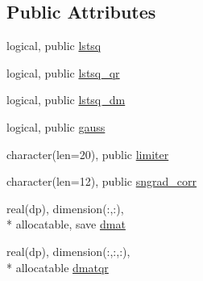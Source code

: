 \subsection*{Public Attributes}
\begin{DoxyCompactItemize}
\item 
logical, public \hyperlink{classgradients_a4ef80ad8cc52782050167ed49c332c1e}{lstsq}
\item 
logical, public \hyperlink{classgradients_ae25a8c84c0815435812f94b82d7dafb7}{lstsq\-\_\-qr}
\item 
logical, public \hyperlink{classgradients_a65547c6133cbc486266ac66604342516}{lstsq\-\_\-dm}
\item 
logical, public \hyperlink{classgradients_ac41921915930ac80ed01373fd760ac51}{gauss}
\item 
character(len=20), public \hyperlink{classgradients_a47d37226aa24f4261a63b5cb1fa3d17c}{limiter}
\item 
character(len=12), public \hyperlink{classgradients_ae02e791dcca067360cb4c1802dd6ef8d}{sngrad\-\_\-corr}
\item 
real(dp), dimension(\-:,\-:), \\*
allocatable, save \hyperlink{classgradients_a0417bd090ffd38c01cbcc0d76068dd82}{dmat}
\item 
real(dp), dimension(\-:,\-:,\-:), \\*
allocatable \hyperlink{classgradients_a916054df6a0aaa257f536e0ef098b188}{dmatqr}
\end{DoxyCompactItemize}
